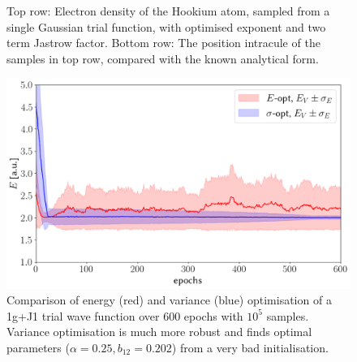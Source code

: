 \documentclass[final,3p,times,twocolumn]{elsarticle}
\begin{document}
\begin{figure}[h]
	\caption{Top row: Electron density of the Hookium atom, sampled from a single Gaussian trial function, with optimised exponent and two term Jastrow factor. Bottom row: The position intracule of the samples in top row, compared with the known analytical form.}
	\label{fig:wfsandpints}
	\end{figure}
		\begin{figure}[h]
			\centering
			\includegraphics[width=\linewidth]{../plots/vmc-opt-1g.png}
			\caption{Comparison of energy (red) and variance (blue) optimisation of a 1g+J1 trial wave function over 600 epochs with $10^5$ samples. Variance optimisation is much more robust and finds optimal parameters ($\alpha = 0.25, b_{12} = 0.202$) from a very bad initialisation.}
			\label{fig:basic-optim}
		\end{figure}
\end{document}

